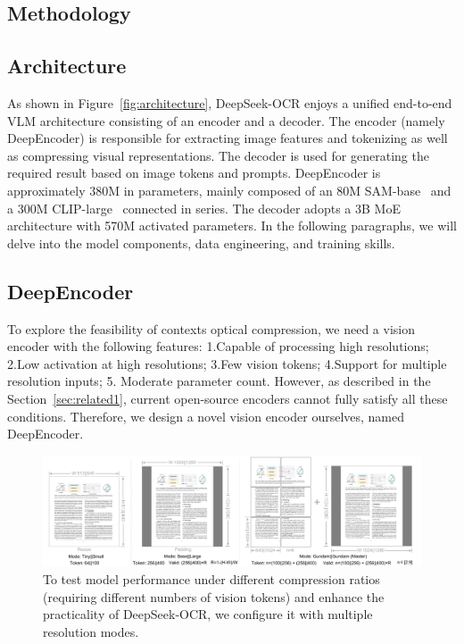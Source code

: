 \documentclass[11pt, a4paper, logo, copyright, nonumbering]{deepseek}
\begin{document}
\begin{CJK*}{UTF8}{gbsn}
\section{Methodology}
\subsection{Architecture}
As shown in Figure~\ref{fig:architecture}, DeepSeek-OCR enjoys a unified end-to-end VLM architecture consisting of an encoder and a decoder. The encoder (namely DeepEncoder) is responsible for extracting image features and tokenizing as well as compressing visual representations. The decoder is used for generating the required result based on image tokens and prompts. DeepEncoder is approximately 380M in parameters, mainly composed of an 80M SAM-base~\cite{kirillov2023segment} and a 300M CLIP-large~\cite{radford2021learning} connected in series. The decoder adopts a 3B MoE~\cite{liu2024deepseekv2,liu2024deepseekv3} architecture with 570M activated parameters. In the following paragraphs, we will delve into the model components, data engineering, and training skills.


\subsection{DeepEncoder}
To explore the feasibility of contexts optical compression, we need a vision encoder with the following features: 1.Capable of processing high resolutions; 2.Low activation at high resolutions; 3.Few vision tokens; 4.Support for multiple resolution inputs; 5. Moderate parameter count. However, as described in the Section~\ref{sec:related1}, current open-source encoders cannot fully satisfy all these conditions. Therefore, we design a novel vision encoder ourselves, named DeepEncoder.


\begin{figure}[ht]
	\centering
    \includegraphics[width=1.0\linewidth]{figures/2.pdf}
	\caption{To test model performance under different compression ratios (requiring different numbers of vision tokens) and enhance the practicality of DeepSeek-OCR, we configure it with multiple resolution modes. }
	\label{fig:resolution}
\end{figure}



\end{CJK*}
\end{document}
